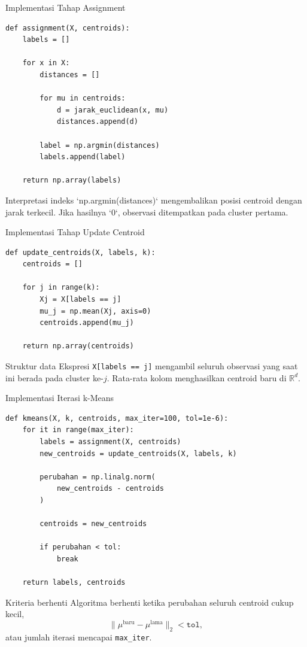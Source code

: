 \documentclass[aspectratio=169,11pt]{beamer}
\begin{document}
\begin{frame}[fragile]{Implementasi Tahap Assignment}
\begin{lstlisting}
def assignment(X, centroids):
    labels = []

    for x in X:
        distances = []

        for mu in centroids:
            d = jarak_euclidean(x, mu)
            distances.append(d)

        label = np.argmin(distances)
        labels.append(label)

    return np.array(labels)
\end{lstlisting}

\begin{block}{Interpretasi indeks}
\small
`np.argmin(distances)` mengembalikan posisi centroid dengan jarak terkecil. Jika hasilnya `0`, observasi ditempatkan pada cluster pertama.
\end{block}
\end{frame}

\begin{frame}[fragile]{Implementasi Tahap Update Centroid}
\begin{lstlisting}
def update_centroids(X, labels, k):
    centroids = []

    for j in range(k):
        Xj = X[labels == j]
        mu_j = np.mean(Xj, axis=0)
        centroids.append(mu_j)

    return np.array(centroids)
\end{lstlisting}

\begin{block}{Struktur data}
\small
Ekspresi \texttt{X[labels == j]} mengambil seluruh observasi yang saat ini berada pada cluster ke-$j$. Rata-rata kolom menghasilkan centroid baru di $\mathbb{R}^d$.
\end{block}
\end{frame}

\begin{frame}[fragile]{Implementasi Iterasi k-Means}
\begin{lstlisting}[basicstyle=\ttfamily\tiny]
def kmeans(X, k, centroids, max_iter=100, tol=1e-6):
    for it in range(max_iter):
        labels = assignment(X, centroids)
        new_centroids = update_centroids(X, labels, k)

        perubahan = np.linalg.norm(
            new_centroids - centroids
        )

        centroids = new_centroids

        if perubahan < tol:
            break

    return labels, centroids
\end{lstlisting}

\begin{block}{Kriteria berhenti}
\small
Algoritma berhenti ketika perubahan seluruh centroid cukup kecil,
\[
\|\mu^{\mathrm{baru}}-\mu^{\mathrm{lama}}\|_2<\texttt{tol},
\]
atau jumlah iterasi mencapai \texttt{max\_iter}.
\end{block}
\end{frame}
\end{document}

